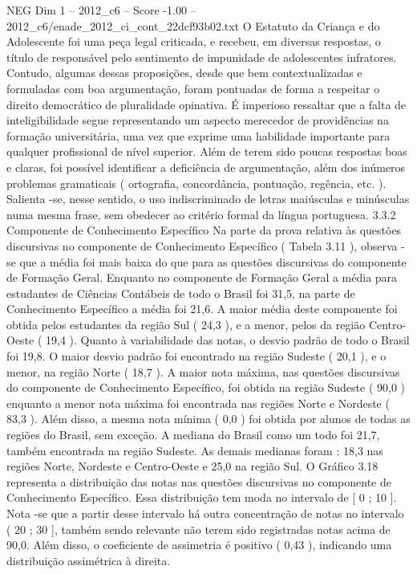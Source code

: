 \begin{textsample}{NEG Dim 1 – 2012\_c6 – Score -1.00 – 2012\_c6/enade\_2012\_ci\_cont\_22dcf93b02.txt}
O Estatuto da Criança e do Adolescente foi uma peça legal criticada, e recebeu, em diversas respostas, o título de responsável pelo sentimento de impunidade de adolescentes infratores.
Contudo, algumas dessas proposições, desde que bem contextualizadas e formuladas com boa argumentação, foram pontuadas de forma a respeitar o direito democrático de pluralidade opinativa.
É imperioso ressaltar que a falta de inteligibilidade segue representando um aspecto merecedor de providências na formação universitária, uma vez que exprime uma habilidade importante para qualquer profissional de nível superior.
Além de terem sido poucas respostas boas e claras, foi possível identificar a deficiência de argumentação, além dos inúmeros problemas gramaticais ( ortografia, concordância, pontuação, regência, etc. ).
Salienta -se, nesse sentido, o uso indiscriminado de letras maiúsculas e minúsculas numa mesma frase, sem obedecer ao critério formal da língua portuguesa. 3.3.2 Componente de Conhecimento Específico Na parte da prova relativa às questões discursivas no componente de Conhecimento Específico ( Tabela 3.11 ), observa -se que a média foi mais baixa do que para as questões discursivas do componente de Formação Geral.
Enquanto no componente de Formação Geral a média para estudantes de Ciências Contábeis de todo o Brasil foi 31,5, na parte de Conhecimento Específico a média foi 21,6.
A maior média deste componente foi obtida pelos estudantes da região Sul ( 24,3 ), e a menor, pelos da região Centro-Oeste ( 19,4 ).
Quanto à variabilidade das notas, o desvio padrão de todo o Brasil foi 19,8.
O maior desvio padrão foi encontrado na região Sudeste ( 20,1 ), e o menor, na região Norte ( 18,7 ).
A maior nota máxima, nas questões discursivas do componente de Conhecimento Específico, foi obtida na região Sudeste ( 90,0 ) enquanto a menor nota máxima foi encontrada nas regiões Norte e Nordeste ( 83,3 ).
Além disso, a mesma nota mínima ( 0,0 ) foi obtida por alunos de todas as regiões do Brasil, sem exceção.
A mediana do Brasil como um todo foi 21,7, também encontrada na região Sudeste.
As demais medianas foram : 18,3 nas regiões Norte, Nordeste e Centro-Oeste e 25,0 na região Sul.
O Gráfico 3.18 representa a distribuição das notas nas questões discursivas no componente de Conhecimento Específico.
Essa distribuição tem moda no intervalo de [ 0 ; 10 ].
Nota -se que a partir desse intervalo há outra concentração de notas no intervalo ( 20 ; 30 ], também sendo relevante não terem sido registradas notas acima de 90,0.
Além disso, o coeficiente de assimetria é positivo ( 0,43 ), indicando uma distribuição assimétrica à direita.

\end{textsample}
